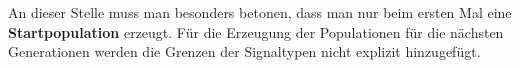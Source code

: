 An dieser Stelle muss man besonders betonen, dass man nur beim ersten Mal eine \textbf{Startpopulation} erzeugt. 
F{\"u}r die Erzeugung der Populationen f{\"u}r die n{\"a}chsten Generationen werden die Grenzen der Signaltypen nicht explizit hinzugef{\"u}gt. 








